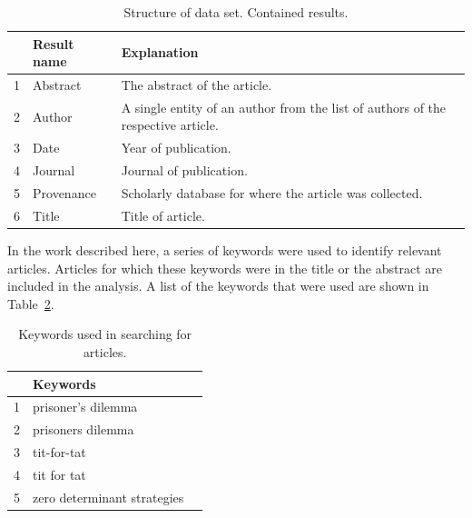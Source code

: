 \documentclass{article}
\begin{document}
\begin{table}[!hbtp]
    \begin{center}
        \begin{tabular}{lll}
            \toprule
             & Result name & Explanation \\
             \midrule
             1 & Abstract & The abstract of the article.\\ 
             2 & Author & A single entity of an author from the list of
             authors of the respective article.\\ 
             3 & Date & Year of publication.\\ 
             4 & Journal & Journal of publication.\\ 
             5 & Provenance & Scholarly database for where the article was
             collected.\\ 
             6 & Title & Title of article.\\ 
            \bottomrule
        \end{tabular}
    \end{center}
    \caption{Structure of data set. Contained results.}
    \label{table:result_set}
\end{table}

In the work described here, a series of keywords were used to identify relevant
articles. Articles for which these keywords were in the title or the abstract
are included in the analysis. A list of the keywords that were used are
shown in Table~\ref{table:search_keywords}.

\begin{table}[!hbtp]
    \begin{center}
        \begin{tabular}{lll}
            \toprule
             & Keywords & \\
            \midrule
             1 &  prisoner's dilemma & \\
             2 &  prisoners dilemma  & \\
             3 &  tit-for-tat & \\
             4 &  tit for tat & \\
             5 &  zero determinant strategies & \\
            \bottomrule
        \end{tabular}
    \end{center}
    \caption{Keywords used in searching for articles.}
    \label{table:search_keywords}
\end{table}
\end{document}
